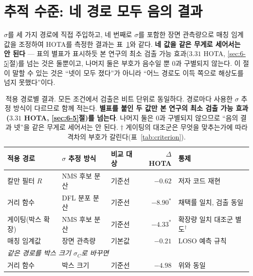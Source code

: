 \documentclass[12pt,a4paper,oneside]{report}
\begin{document}
\section{추적 수준: 네 경로 모두 음의 결과}\label{sec:5-3}

$\sigma$를 세 가지 경로에 직접 주입하고, 네 번째로 $\sigma$를 포함한 장면 관측량으로 매칭 임계값을 조정하여 HOTA를 측정한 결과는 표~\ref{tab:channels}와 같다. \textbf{네 값을 같은 무게로 세어서는 안 된다} --- 표의 별표가 표시하듯 본 연구의 최소 검출 가능 효과($3.31$ HOTA, \ref{sec:6-5}절)를 넘는 것은 둘뿐이고, 나머지 둘은 부호가 음수일 뿐 $0$과 구별되지 않는다. 이 절이 말할 수 있는 것은 ``넷이 모두 졌다''가 아니라 ``어느 경로도 이득 쪽으로 해상도를 넘지 못했다''이다.

\begin{table}[htbp]
\centering
\small
\caption{적용 경로별 결과. 모든 조건에서 검출은 비트 단위로 동일하다. 경로마다 사용한 $\sigma$ 추정 방식이 다르므로 함께 적는다. \textbf{별표를 붙인 두 값만 본 연구의 최소 검출 가능 효과($3.31$ HOTA, \ref{sec:6-5}절)를 넘는다}. 나머지 둘은 $0$과 구별되지 않으므로 ``음의 결과 넷''을 같은 무게로 세어서는 안 된다. $\dagger$ 게이팅의 대조군은 무엇을 맞추는가에 따라 격차의 부호가 갈린다(표~\ref{tab:criterion}).}
\label{tab:channels}
\begin{tabular}{lllrl}
\toprule
적용 경로 & $\sigma$ 추정 방식 & 비교 대상 & $\Delta$HOTA & 통제 \\
\midrule
칼만 필터 $R$ & NMS 후보 분산 & 기준선 & $-0.62$ & 저자 코드 재현 \\
거리 함수 & DFL 분포 분산 & 기준선 & $-8.90^{*}$ & 채택률 일치, 검출 동일 \\
게이팅(박스 확장) & NMS 후보 분산 & 기준선 & $-4.33^{*}$ & 확장량 일치 대조군 별도$^{\dagger}$ \\
매칭 임계값 & 장면 관측량 & 기본값 & $-0.21$ & LOSO 예측 규칙 \\
\midrule
\multicolumn{5}{l}{\textit{같은 경로를 박스 크기 $\sigma_C$로 바꾸면}} \\
거리 함수 & 박스 크기 & 기준선 & $-4.98$ & 위와 동일 \\
\bottomrule
\end{tabular}
\end{table}
\end{document}
